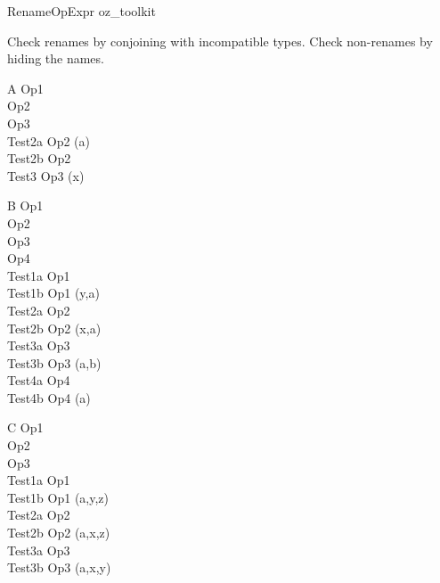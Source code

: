 \begin{zsection}
  \SECTION RenameOpExpr \parents oz\_toolkit
\end{zsection}

Check renames by conjoining with incompatible types.
Check non-renames by hiding the names.

\begin{class}{A}
  Op1 \sdef [| true] [a/x]\\
  Op2 \sdef [x : \nat] [a/x]\\
  Op3 \sdef [x : \nat] [x/a]\\
  Test2a \sdef Op2 \hide (a)\\
  Test2b \sdef Op2 \\
  Test3 \sdef Op3 \hide (x)\\
\end{class}

\begin{class}{B}
  Op1 \\
  Op2 \\
  Op3 \\
  Op4 \\
  Test1a \sdef Op1 \\
  Test1b \sdef Op1 \hide (y,a)\\
  Test2a \sdef Op2 \\
  Test2b \sdef Op2 \hide (x,a)\\
  Test3a \sdef Op3 \\
  Test3b \sdef Op3 \hide (a,b)\\
  Test4a \sdef Op4 \\
  Test4b \sdef Op4 \hide (a)
\end{class}

\begin{class}{C}
  Op1 \\
  Op2 \\
  Op3 \\
  Test1a \sdef Op1 \\
  Test1b \sdef Op1 \hide (a,y,z)\\
  Test2a \sdef Op2 \\
  Test2b \sdef Op2 \hide (a,x,z)\\
  Test3a \sdef Op3 \land [z : \nat]\\
  Test3b \sdef Op3 \hide (a,x,y)
\end{class}

